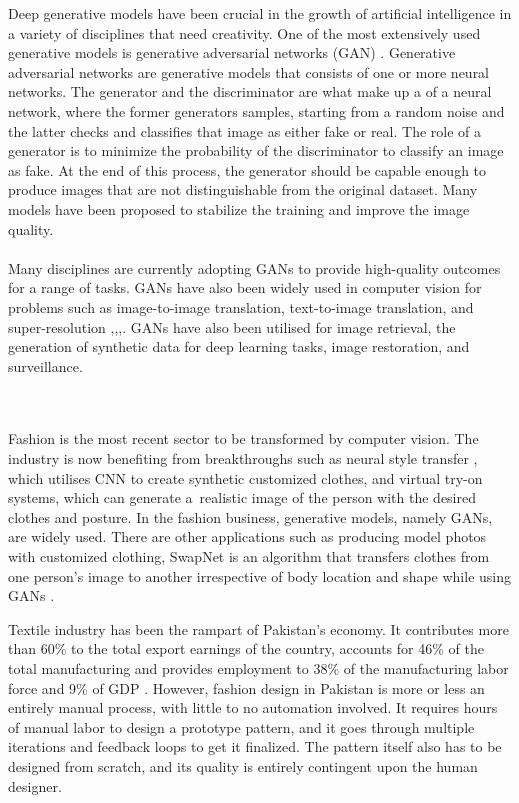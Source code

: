 \documentclass[conference]{IEEEtran}
\begin{document}
Deep generative models have been crucial in the growth of artificial intelligence in a variety of disciplines that need creativity. One of the most extensively used generative models is generative adversarial networks (GAN) \cite{b5}. Generative adversarial networks are generative models that consists of one or more neural networks. The generator and the discriminator are what make up a of a neural network, where the former generators samples, starting from a random noise and the latter checks and classifies that image as either fake or real. The role of a generator is to minimize the probability of the discriminator to classify an image as fake. At the end of this process, the generator should be capable enough to produce images that are not distinguishable from the original dataset. Many models have been proposed to stabilize the training and improve the image quality. 
\\\\Many disciplines are currently adopting GANs to provide high-quality outcomes for a range of tasks. GANs have also been widely used in computer vision for problems such as image-to-image translation, text-to-image translation, and super-resolution \cite{b6},\cite{b7},\cite{b8},\cite{b9}. GANs have also been utilised for image retrieval, the generation of synthetic data for deep learning tasks, image restoration, and surveillance.

\\\\Fashion is the most recent sector to be transformed by computer vision. The industry is now benefiting from breakthroughs such as neural style transfer \cite{b11}, which utilises CNN to create synthetic customized clothes, and virtual try-on systems, which can generate a realistic image of the person with the desired clothes and posture. In the fashion business, generative models, namely GANs, are widely used. There are other applications such as producing model photos with customized clothing, SwapNet is an algorithm that transfers clothes from one person's image to another irrespective of body location and shape while using GANs \cite{b12}.

Textile industry has been the rampart of Pakistan's economy. It contributes more than 60\% to the total export earnings of the country, accounts for 46\% of the total manufacturing and provides employment to 38\% of the manufacturing labor force and 9\% of GDP \cite{b1}. However, fashion design in Pakistan is more or less an entirely manual process, with little to no automation involved. It requires hours of manual labor to design a prototype pattern, and it goes through multiple iterations and feedback loops to get it finalized. The pattern itself also has to be designed from scratch, and its quality is entirely contingent upon the human designer. 
\end{document}
